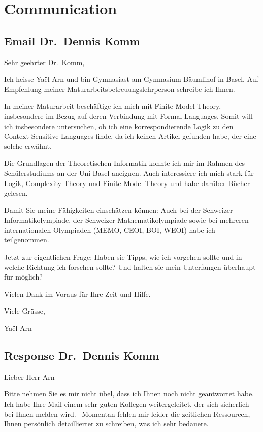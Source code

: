 \chapter{Communication}\label{ch:communications}


\section{Email Dr.~Dennis Komm}\label{email-dr.-dennis-komm}

Sehr geehrter Dr.~Komm,

Ich heisse Yaël Arn und bin Gymnasiast am Gymnasium Bäumlihof in Basel.
Auf Empfehlung meiner Maturarbeitsbetreuungslehrperson schreibe ich
Ihnen.

In meiner Maturarbeit beschäftige ich mich mit Finite Model Theory,
insbesondere im Bezug auf deren Verbindung mit Formal Languages. Somit
will ich insbesondere untersuchen, ob ich eine korrespondierende Logik
zu den Context-Sensitive Languages finde, da ich keinen Artikel gefunden
habe, der eine solche erwähnt.

Die Grundlagen der Theoretischen Informatik konnte ich mir im Rahmen des
Schülerstudiums an der Uni Basel aneignen. Auch interessiere ich mich
stark für Logik, Complexity Theory und Finite Model Theory und habe
darüber Bücher gelesen.

Damit Sie meine Fähigkeiten einschätzen können: Auch bei der Schweizer
Informatikolympiade, der Schweizer Mathematikolympiade sowie bei
mehreren internationalen Olympiaden (MEMO, CEOI, BOI, WEOI) habe ich
teilgenommen.

Jetzt zur eigentlichen Frage: Haben sie Tipps, wie ich vorgehen sollte
und in welche Richtung ich forschen sollte? Und halten sie mein
Unterfangen überhaupt für möglich?

Vielen Dank im Voraus für Ihre Zeit und Hilfe.

Viele Grüsse,

Yaël Arn


\section{Response Dr.~Dennis Komm}\label{response-dr.-dennis-komm}

Lieber Herr Arn

Bitte nehmen Sie es mir nicht übel, dass ich Ihnen noch nicht
geantwortet habe.~ Ich habe Ihre Mail einem sehr guten Kollegen
weitergeleitet, der sich sicherlich bei Ihnen melden wird.~ Momentan
fehlen mir leider die zeitlichen Ressourcen, Ihnen persönlich
detaillierter zu schreiben, was ich sehr bedauere.

